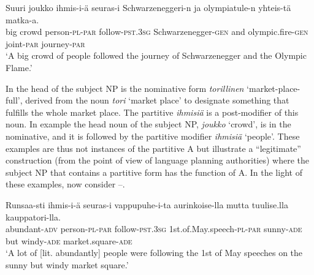 \documentclass[output=paper]{LSP/langsci}
\begin{document}
\ea\label{15-hu-ex:35}
\gll Suuri joukko ihmis-i-ä seuras-i Schwarzeneggeri-n ja olympiatule-n yhteis-tä matka-a.\\
big crowd person-\textsc{pl}-\textsc{par} follow-\textsc{pst}.\textsc{3sg} Schwarzenegger-\textsc{gen} and olympic.fire-\textsc{gen} joint-\textsc{par} journey-\textsc{par}\\
\glt ‘A big crowd of people followed the journey of Schwarzenegger and the Olympic Flame.’ %
\z

In  the head of the subject NP is the nominative form \textit{torillinen} ‘market-place-full’, derived from the noun \textit{tori} ‘market place’ to designate something that fulfills the whole market place. The partitive \textit{ihmisiä} is a post-modifier of this noun. In example  the head noun of the subject NP, \textit{joukko} ‘crowd’, is in the nominative, and it is followed by the partitive modifier \textit{ihmisiä} ‘people’. These examples are thus not instances of the partitive A but illustrate a “legitimate” construction (from the point of view of language planning authorities) where the subject NP that contains a partitive form has the function of A. In the light of these examples, now consider --. 

\ea \label{15-hu-ex:36}
\gll Runsaa-sti ihmis-i-ä seuras-i vappupuhe-i-ta aurinkoise-lla mutta tuulise.lla kauppatori-lla.\\
abundant-\textsc{adv} person-\textsc{pl}-\textsc{par} follow-\textsc{pst}.\textsc{3sg} 1st.of.May.speech-\textsc{pl}-\textsc{par} sunny-\textsc{ade} but windy-\textsc{ade} market.square-\textsc{ade}\\
\glt ‘A lot of [lit. abundantly] people were following the 1st  of May speeches on the sunny but windy market square.’ %
\z

\ea\label{15-hu-ex:38}
\end{document}
